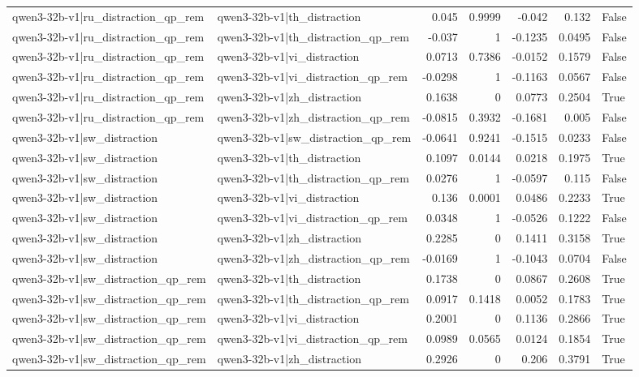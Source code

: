\begin{table}
\begin{tabular}{l l r r r r l}
qwen3-32b-v1|ru_distraction_qp_rem & qwen3-32b-v1|th_distraction & 0.045 & 0.9999 & -0.042 & 0.132 & False \\
qwen3-32b-v1|ru_distraction_qp_rem & qwen3-32b-v1|th_distraction_qp_rem & -0.037 & 1 & -0.1235 & 0.0495 & False \\
qwen3-32b-v1|ru_distraction_qp_rem & qwen3-32b-v1|vi_distraction & 0.0713 & 0.7386 & -0.0152 & 0.1579 & False \\
qwen3-32b-v1|ru_distraction_qp_rem & qwen3-32b-v1|vi_distraction_qp_rem & -0.0298 & 1 & -0.1163 & 0.0567 & False \\
qwen3-32b-v1|ru_distraction_qp_rem & qwen3-32b-v1|zh_distraction & 0.1638 & 0 & 0.0773 & 0.2504 & True \\
qwen3-32b-v1|ru_distraction_qp_rem & qwen3-32b-v1|zh_distraction_qp_rem & -0.0815 & 0.3932 & -0.1681 & 0.005 & False \\
qwen3-32b-v1|sw_distraction & qwen3-32b-v1|sw_distraction_qp_rem & -0.0641 & 0.9241 & -0.1515 & 0.0233 & False \\
qwen3-32b-v1|sw_distraction & qwen3-32b-v1|th_distraction & 0.1097 & 0.0144 & 0.0218 & 0.1975 & True \\
qwen3-32b-v1|sw_distraction & qwen3-32b-v1|th_distraction_qp_rem & 0.0276 & 1 & -0.0597 & 0.115 & False \\
qwen3-32b-v1|sw_distraction & qwen3-32b-v1|vi_distraction & 0.136 & 0.0001 & 0.0486 & 0.2233 & True \\
qwen3-32b-v1|sw_distraction & qwen3-32b-v1|vi_distraction_qp_rem & 0.0348 & 1 & -0.0526 & 0.1222 & False \\
qwen3-32b-v1|sw_distraction & qwen3-32b-v1|zh_distraction & 0.2285 & 0 & 0.1411 & 0.3158 & True \\
qwen3-32b-v1|sw_distraction & qwen3-32b-v1|zh_distraction_qp_rem & -0.0169 & 1 & -0.1043 & 0.0704 & False \\
qwen3-32b-v1|sw_distraction_qp_rem & qwen3-32b-v1|th_distraction & 0.1738 & 0 & 0.0867 & 0.2608 & True \\
qwen3-32b-v1|sw_distraction_qp_rem & qwen3-32b-v1|th_distraction_qp_rem & 0.0917 & 0.1418 & 0.0052 & 0.1783 & True \\
qwen3-32b-v1|sw_distraction_qp_rem & qwen3-32b-v1|vi_distraction & 0.2001 & 0 & 0.1136 & 0.2866 & True \\
qwen3-32b-v1|sw_distraction_qp_rem & qwen3-32b-v1|vi_distraction_qp_rem & 0.0989 & 0.0565 & 0.0124 & 0.1854 & True \\
qwen3-32b-v1|sw_distraction_qp_rem & qwen3-32b-v1|zh_distraction & 0.2926 & 0 & 0.206 & 0.3791 & True \\

\end{tabular}
\end{table}
